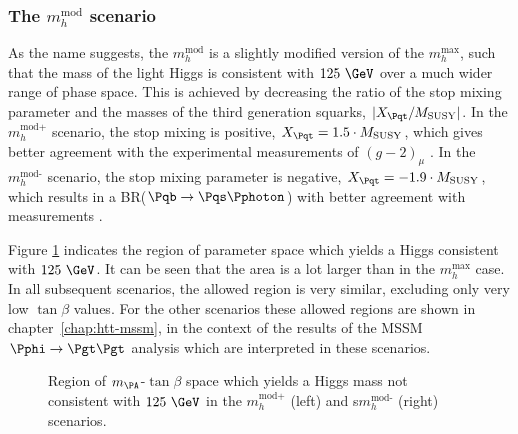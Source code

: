 \subsubsection{The $m_{h}^{\text{mod}}$ scenario}
\label{sec:mhmodscenario}

As the name suggests, the $m_{h}^{\text{mod}}$ is a slightly modified version of
the $m_{h}^{\text{max}}$, such that the mass of the light Higgs is consistent
with $125~\GeV$ over a much wider range of phase space. This is achieved by
decreasing the ratio of the stop mixing parameter and the masses of the third
generation squarks, $|X_{\Pqt}/M_{\text{SUSY}}|$. In the $m_{h}^{\text{mod+}}$
scenario, the stop mixing is positive, $X_{\Pqt} = 1.5 \cdot M_{\text{SUSY}}$,
which gives better agreement with the experimental measurements of $(g-2)_{\mu}$
\cite{Miller:2007kk}. In the $m_{h}^{\text{mod-}}$ scenario, the stop mixing parameter is
negative, $X_{\Pqt} = -1.9 \cdot M_{\text{SUSY}}$, which results in a
BR($\Pqb\to\Pqs\Pphoton$) with better agreement with measurements
\cite{Lees:2012wg}.

Figure \ref{fig:mhmodmass} indicates the region of parameter space which yields
a Higgs consistent with $125~\GeV$. It can be seen that the area is a lot larger
than in the $m_{h}^{\text{max}}$ case. In all subsequent scenarios, the allowed
region is very similar, excluding only very low $\tan\beta$ values. For the
other scenarios these allowed regions are shown in chapter~\ref{chap:htt-mssm},
in the context of the results of the MSSM $\Pphi \to \Pgt\Pgt$ analysis which
are interpreted in these scenarios.

\begin{figure}[htbp]
\caption{Region of $m_{\PA}$-$\tan\beta$ space which yields a Higgs mass not
consistent with $125~\GeV$ in the $m_{h}^{\text{mod+}}$ (left) and
s$m_{h}^{\text{mod-}}$ (right) scenarios.}
\label{fig:mhmodmass}
\end{figure}

